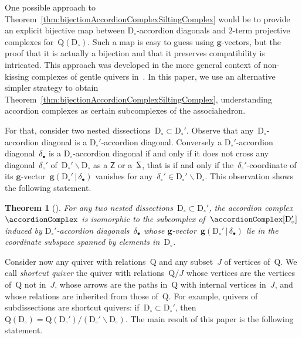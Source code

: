 \documentclass{amsart}
\newtheorem{theorem}{Theorem}%
\theoremstyle{definition}
\renewcommand{\b}[1]{\mathbf{#1}} %
\newcommand{\ssm}{\smallsetminus} %
\newcommand{\darkblue}{\color{darkblue}} %
\newcommand{\defn}[1]{\textsl{\darkblue #1}} %
\newcommand{\dissection}{\mathrm{D}} %
\newcommand{\sign}[3]{\varepsilon \big( {#1} \in {#2}\;|\;{#3} \big)} %
\newcommand{\SSS}{\reflectbox{$\mathsf{Z}$}} %
\newcommand{\ZZZ}{\mathsf{Z}} %
\newcommand{\gvector}[2]{\mathbf{g}(#1 \,|\, #2)} %
\newcommand{\quiver}{\mathrm{Q}} %
\begin{document}
One possible approach to Theorem~\ref{thm:bijectionAccordionComplexSiltingComplex} would be to provide an explicit bijective map between $\dissection_\circ$-accordion diagonals and $2$-term projective complexes for~$\quiver(\dissection_\circ)$.
Such a map is easy to guess using $\b{g}$-vectors, but the proof that it is actually a bijection and that it preserves compatibility is intricated.
This approach was developed in the more general context of non-kissing complexes of gentle quivers in~\cite{PaluPilaudPlamondon}.
In this paper, we use an alternative simpler strategy to obtain Theorem~\ref{thm:bijectionAccordionComplexSiltingComplex}, understanding accordion complexes as certain subcomplexes of the associahedron.

For that, consider two nested dissections~$\dissection_\circ \subset \dissection_\circ'$.
Observe that any~$\dissection_\circ$-accordion diagonal is a $\dissection_\circ'$-accordion diagonal.
Conversely a $\dissection_\circ'$-accordion diagonal~$\delta_\bullet$ is a $\dissection_\circ$-accordion diagonal if and only if it does not cross any diagonal~$\delta_\circ'$ of~$\dissection_\circ' \ssm \dissection_\circ$ as a $\ZZZ$ or a~$\SSS$, that is if and only if the~$\delta_\circ'$-coordinate of its $\b{g}$-vector~$\gvector{\dissection_\circ'}{\delta_\bullet}$ vanishes for any~$\delta_\circ' \in \dissection_\circ' \ssm \dissection_\circ$.
This observation shows the following statement.

\begin{theorem}[\cite{MannevillePilaud-accordion}]
\label{thm:contractDiagonals}
For any two nested dissections~$\dissection_\circ \subset \dissection_\circ'$, the accordion complex~$\accordionComplex$ is isomorphic to the subcomplex of~$\accordionComplex[\dissection_\circ']$ induced by $\dissection_\circ'$-accordion diagonals~$\delta_\bullet$ whose $\b{g}$-vector~$\gvector{\dissection_\circ'}{\delta_\bullet}$ lie in the coordinate subspace spanned by elements in~$\dissection_\circ$.
\end{theorem}

Consider now any quiver with relations~$\quiver$ and any subset~$J$ of vertices of~$\quiver$.
We call \defn{shortcut quiver} the quiver with relations~$\quiver/J$ whose vertices are the vertices of~$\quiver$ not in~$J$, whose arrows are the paths in~$\quiver$ with internal vertices in~$J$, and whose relations are inherited from those of~$\quiver$.
For example, quivers of subdissections are shortcut quivers: if~$\dissection_\circ \subset \dissection_\circ'$, then~${\quiver(\dissection_\circ) = \quiver(\dissection_\circ')/(\dissection_\circ' \ssm \dissection_\circ)}$.
The main result of this paper is the following statement.
\end{document}
